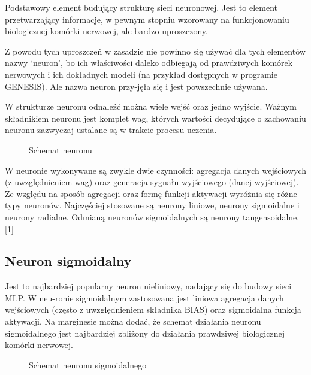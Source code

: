 \documentclass{article}
\begin{document}
Podstawowy element budujący strukturę sieci neuronowej. Jest to element przetwarzający
informacje, w pewnym stopniu wzorowany na funkcjonowaniu biologicznej komórki nerwowej,
ale bardzo uproszczony.

Z powodu tych uproszczeń w  zasadzie nie powinno się używać dla tych elementów nazwy ‘neuron’,
bo ich właściwości daleko odbiegają od prawdziwych komórek nerwowych i ich dokładnych modeli
(na przykład dostępnych w programie GENESIS). Ale nazwa neuron przy-jęła się i jest
powszechnie używana.

W strukturze neuronu odnaleźć można wiele wejść oraz jedno wyjście. Ważnym składnikiem
neuronu jest komplet wag, których wartości decydujące o zachowaniu neuronu zazwyczaj
ustalane są w trakcie procesu uczenia.

\begin{figure}[h]
  \centering
  \caption{Schemat neuronu}
\end{figure}

W  neuronie wykonywane są zwykle dwie czynności: agregacja danych wejściowych
(z  uwzględnieniem  wag) oraz generacja sygnału wyjściowego (danej wyjściowej).
Ze względu na sposób agregacji oraz formę funkcji aktywacji wyróżnia się różne typy
neuronów. Najczęściej stosowane są neurony liniowe, neurony sigmoidalne i neurony radialne.
Odmianą neuronów sigmoidalnych są neurony tangensoidalne.[1]

\subsection{Neuron sigmoidalny}

Jest to najbardziej popularny neuron nieliniowy, nadający się do budowy sieci MLP.
W neu-ronie sigmoidalnym zastosowana jest liniowa agregacja danych wejściowych
(często z  uwzględnieniem składnika BIAS) oraz sigmoidalna funkcja aktywacji.
Na marginesie można dodać, że schemat działania neuronu sigmoidalnego jest najbardziej
zbliżony do działania prawdziwej biologicznej komórki nerwowej.

\begin{figure}[h]
  \centering
  \caption{Schemat neuronu sigmoidalnego}
\end{figure}
\end{document}
